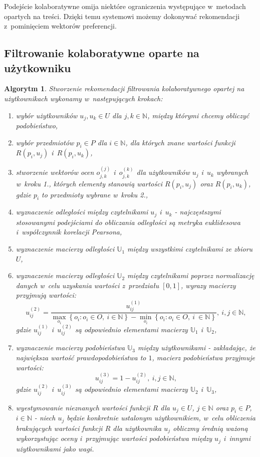 \documentclass[12pt,a4paper]{report}
\newtheorem{algorytm}[df]{Algorytm}
\newcommand{\set}[1]{\left\lbrace {#1} \right\rbrace}
\newcommand{\setN}{\mathbb{N}}
\newcommand{\setUzytkownicy}{\mathit{U}}
\newcommand{\setPrzedmioty}{\mathit{P}}
\newcommand{\setOceny}{\mathit{O}}
\begin{document}
Podejście kolaboratywne omija niektóre ograniczenia występujące w~metodach opartych na treści. Dzięki temu systemowi możemy dokonywać rekomendacji z~pominięciem wektorów preferencji. 

\subsection{Filtrowanie kolaboratywne oparte na użytkowniku}

\begin{algorytm}
Stworzenie rekomendacji filtrowania kolaboratywnego opartej na użytkownikach wykonamy w~następujących krokach:
\begin{enumerate}
\item wybór użytkowników $u_j, u_k \in \setUzytkownicy$ dla $j,k \in \setN$, między którymi chcemy obliczyć podobieństwo,
\item wybór przedmiotów $p_i \in \setPrzedmioty$ dla $i \in \setN$, dla których znane wartości funkcji $R(p_i,u_j)$ i~$R(p_i,u_k)$,
\item stworzenie wektorów ocen $o_{j,k}^{(j)}$ i~$o_{j,k}^{(k)}$ dla użytkowników $u_j$ i~$u_k$ wybranych w~kroku 1., których elementy stanowią wartości $R(p_i,u_j)$ oraz $R(p_i,u_k)$, gdzie $p_i$ to przedmioty wybrane w~kroku 2.,
\item wyznaczenie odległości między czytelnikami $u_j$ i~$u_k$ - najczęstszymi stosowanymi podejściami do obliczania odległości są metryka euklidesowa i~współczynnik korelacji Pearsona,
\item wyznaczenie macierzy odległości $\mathbb{U}_1$ między wszystkimi czytelnikami ze zbioru $\setUzytkownicy$,
\item wyznaczenie macierzy odległości $\mathbb{U}_2$ między czytelnikami poprzez normalizację danych w~celu uzyskania wartości z~przedziału $[0,1]$, wyrazy macierzy przyjmują wartości:
$$
u_{ij}^{(2)} = \frac{u_{ij}^{(1)}}{\max_{o_i} \set{o_i : o_i \in \setOceny,\: i \in \setN } - \min_{o_i} \set{o_i : o_i \in \setOceny, \: i~\in \setN}}, \: i,j \in \setN ,
$$
gdzie $u_{ij}^{(1)}$ i~$u_{ij}^{(2)}$ są odpowiednio elementami macierzy $\mathbb{U}_1$ i~$\mathbb{U}_2$,
\item wyznaczenie macierzy podobieństwa $\mathbb{U}_3$ między użytkownikami - zakładając, że największa wartość prawdopodobieństwa to $1$, macierz podobieństwa przyjmuje wartości:
$$
u_{ij}^{(3)} = 1 - u_{ij}^{(2)}, \: i,j \in \setN ,
$$
gdzie $u_{ij}^{(2)}$ i~$u_{ij}^{(3)}$ są odpowiednio elementami macierzy $\mathbb{U}_2$ i~$\mathbb{U}_3$,
\item wyestymowanie nieznanych wartości funkcji $R$ dla $u_j \in \setUzytkownicy$, $j \in \setN$ oraz $p_i \in \setPrzedmioty$, $i \in \setN$  - niech $u_j$ będzie konkretnie ustalonym użytkownikiem, w~celu obliczenia brakujących wartości funkcji $R$ dla użytkownika $u_j$ obliczmy średnią ważoną wykorzystując oceny i~przyjmując wartości podobieństwa między $u_j$ i~innymi użytkownikami jako wagi.
\end{enumerate}
\end{algorytm}
\end{document}
